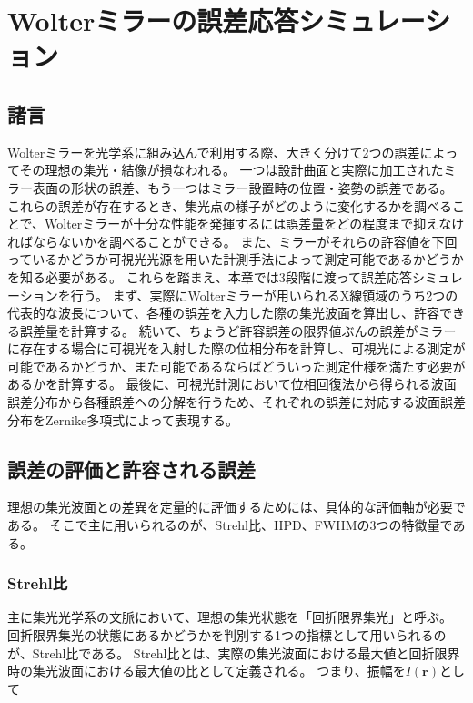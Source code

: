 \chapter{Wolterミラーの誤差応答シミュレーション}
\thispagestyle{empty}
\label{chap2}
\graphicspath{{chap2/figure/}}
\minitoc

\newpage


\section{諸言}
\label{chap2_introduction}

Wolterミラーを光学系に組み込んで利用する際、大きく分けて2つの誤差によってその理想の集光・結像が損なわれる。
一つは設計曲面と実際に加工されたミラー表面の形状の誤差、もう一つはミラー設置時の位置・姿勢の誤差である。
これらの誤差が存在するとき、集光点の様子がどのように変化するかを調べることで、Wolterミラーが十分な性能を発揮するには誤差量をどの程度まで抑えなければならないかを調べることができる。
また、ミラーがそれらの許容値を下回っているかどうか可視光光源を用いた計測手法によって測定可能であるかどうかを知る必要がある。
これらを踏まえ、本章では3段階に渡って誤差応答シミュレーションを行う。
まず、実際にWolterミラーが用いられるX線領域のうち2つの代表的な波長について、各種の誤差を入力した際の集光波面を算出し、許容できる誤差量を計算する。
続いて、ちょうど許容誤差の限界値ぶんの誤差がミラーに存在する場合に可視光を入射した際の位相分布を計算し、可視光による測定が可能であるかどうか、また可能であるならばどういった測定仕様を満たす必要があるかを計算する。
最後に、可視光計測において位相回復法から得られる波面誤差分布から各種誤差への分解を行うため、それぞれの誤差に対応する波面誤差分布をZernike多項式によって表現する。

\clearpage
\newpage
\section{誤差の評価と許容される誤差}
\label{chap2_beam_evaluation_standard}

理想の集光波面との差異を定量的に評価するためには、具体的な評価軸が必要である。
そこで主に用いられるのが、Strehl比、HPD、FWHMの3つの特徴量である。

\subsection{Strehl比}
\label{chap2_strehl_ratio}
主に集光光学系の文脈において、理想の集光状態を「回折限界集光」と呼ぶ。
回折限界集光の状態にあるかどうかを判別する1つの指標として用いられるのが、Strehl比である。
Strehl比とは、実際の集光波面における最大値と回折限界時の集光波面における最大値の比として定義される。
つまり、振幅を$I(\mathbf{r})$として

